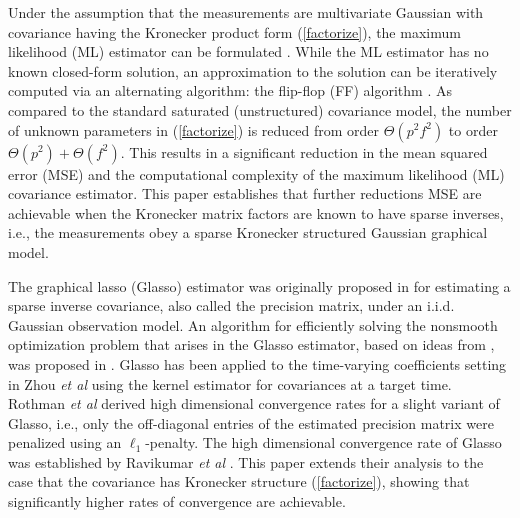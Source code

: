 \documentclass[journal,11pt,draftcls,onecolumn]{IEEEtran}
\begin{document}
Under the assumption that the measurements are multivariate Gaussian with covariance having the Kronecker product form (\ref{factorize}), the maximum likelihood (ML) estimator can be formulated \cite{LuZimmerman2}. While the ML estimator has no known closed-form solution, an approximation to the solution can be iteratively computed via an alternating algorithm: the flip-flop (FF) algorithm \cite{LuZimmerman2, EstCovMatKron}.  As compared to the standard saturated (unstructured) covariance model, the number of unknown parameters in (\ref{factorize}) is reduced from order $\Theta(p^2 f^2)$ to order $\Theta(p^2)+\Theta(f^2)$.
This results in a significant reduction in the mean squared error (MSE) and the computational complexity of the maximum likelihood (ML) covariance estimator. This paper establishes that further reductions MSE are achievable when the Kronecker matrix factors are known to have sparse inverses, i.e., the measurements obey a sparse Kronecker structured Gaussian graphical model.

The graphical lasso (Glasso) estimator was originally proposed in \cite{YL07, ModelSel} for estimating a sparse inverse covariance, also called the precision matrix, under an i.i.d. Gaussian observation model. An algorithm for efficiently solving the nonsmooth optimization problem that arises in the Glasso estimator, based on ideas from \cite{ModelSel}, was proposed in \cite{Glasso}. Glasso has been applied to the time-varying coefficients setting in Zhou {\it et al} \cite{TimeVaryingGraphs} using the kernel estimator for covariances at a target time. Rothman {\it et al} \cite{Rothman} derived high dimensional convergence rates for a slight variant of Glasso, i.e., only the off-diagonal entries of the estimated precision matrix were penalized using an $\ell_1$-penalty. The high dimensional convergence rate of Glasso was established by Ravikumar {\it et al}  \cite{RWRY08}. This paper extends their analysis to the case that the covariance has Kronecker structure (\ref{factorize}), showing that significantly higher rates of convergence are achievable.
\end{document}
